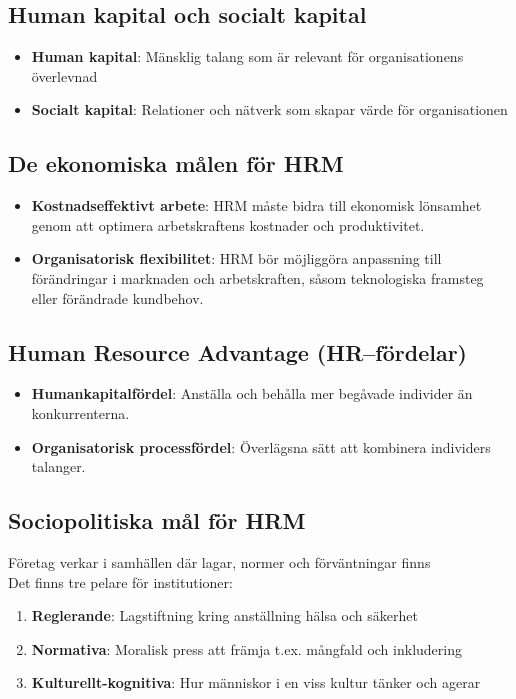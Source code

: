 \documentclass[12pt,a4paper]{article}
\begin{document}
\subsection{Human kapital och socialt kapital}
\begin{itemize}
    \item \textbf{Human kapital}: Mänsklig talang som är relevant för organisationens överlevnad
    \item \textbf{Socialt kapital}: Relationer och nätverk som skapar värde för organisationen
\end{itemize}

\subsection{De ekonomiska målen för HRM}
\begin{itemize}
    \item \textbf{Kostnadseffektivt arbete}: HRM måste bidra till ekonomisk lönsamhet genom att optimera arbetskraftens kostnader och produktivitet.
    \item \textbf{Organisatorisk flexibilitet}: HRM bör möjliggöra anpassning till förändringar i marknaden och arbetskraften, såsom teknologiska framsteg eller förändrade kundbehov.
\end{itemize}

\subsection{Human Resource Advantage (HR--fördelar)}
\begin{itemize}
    \item \textbf{Humankapitalfördel}: Anställa och behålla mer begåvade individer än konkurrenterna.
    \item \textbf{Organisatorisk processfördel}: Överlägsna sätt att kombinera individers talanger.
\end{itemize}

\subsection{Sociopolitiska mål för HRM}
Företag verkar i samhällen där lagar, normer och förväntningar finns
\\

Det finns tre pelare för institutioner:
\begin{enumerate}
    \item \textbf{Reglerande}: Lagstiftning kring anställning hälsa och säkerhet
    \item \textbf{Normativa}: Moralisk press att främja t.ex. mångfald och inkludering
    \item \textbf{Kulturellt-kognitiva}: Hur människor i en viss kultur tänker och agerar
\end{enumerate}
\end{document}
